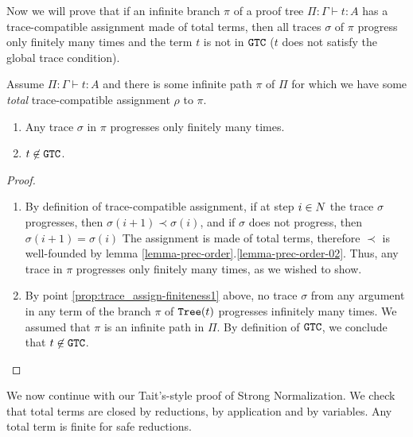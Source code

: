 Now we will prove that if an infinite branch $\pi$ of a proof tree $\Pi:\Gamma \vdash t:A$ 
has a trace-compatible assignment made of total terms, 
then all traces $\sigma$ of $\pi$ progress only finitely many times and the term $t$ is not in ${\tt GTC}$
($t$ does not satisfy the global trace condition).



\begin{proposition}
\label{prop:trace_assign-finiteness}
Assume $\Pi:\Gamma \vdash t:A$ and there is some infinite path $\pi$ of $\Pi$ for which we have
some \emph{total} trace-compatible assignment  $\rho$ to $\pi$. 
\begin{enumerate}
\item
\label{prop:trace_assign-finiteness1}
Any trace $\sigma$ in $\pi$ progresses only finitely many times.
\item
\label{prop:trace_assign-finiteness2}
$t \not \in {\tt GTC}$.
\end{enumerate}
\end{proposition}



\begin{proof}
\begin{enumerate}
\item
By definition of trace-compatible assignment, if at step $i \in {N}$ the trace $\sigma$ progresses, 
then $\sigma(i+1)\prec \sigma(i)$, and if $\sigma$ does not progress, 
then $\sigma(i+1) = \sigma(i)$
The assignment is made of total terms, therefore
 $\prec$ is well-founded by lemma \ref{lemma-prec-order}.\ref{lemma-prec-order-02}.
Thus, any  trace in $\pi$ progresses only finitely many times, as we wished to show.

\item
By point \ref{prop:trace_assign-finiteness1} above, no trace $\sigma$ 
from any argument in any term of the branch $\pi$ of ${\tt Tree}(t)$ progresses infinitely many times.
We assumed that $\pi$ is an infinite path in $\Pi$.
By definition of ${\tt GTC}$, we conclude that $t \not \in {\tt GTC}$. 
\end{enumerate}
\end{proof}


We now continue with our Tait's-style proof of Strong Normalization.
We check that total terms are closed by reductions, by application and by variables.
Any total term is finite for safe reductions.



